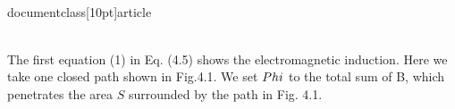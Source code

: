 \\documentclass[10pt]{article}
\begin{document}
\\[
\\left.\\begin{array}{l}
\\text { (1) } \\nabla \\times \\mathbf{E}=-\\frac{\\partial \\mathbf{B}}{\\partial t}, \\quad \\mathbf{B}=\\mu_{0} \\mathbf{H} \\\\
\\text { (2) } \\nabla \\times \\mathbf{H}=\\frac{\\partial \\mathbf{D}}{\\partial t}+\\mathbf{J}, \\mathbf{D}=\\varepsilon_{0} \\mathbf{E}  \\tag{4.5}\\\\
\\text { (3) } \\nabla \\cdot \\mathbf{E}=\\frac{\\rho}{\\varepsilon_{0}} \\\\
\\text { (4) } \\nabla \\cdot \\mathbf{B}=0
\\end{array}\\right\\}
\\]

The first equation (1) in Eq. (4.5) shows the electromagnetic induction. Here we take one closed path shown in Fig.4.1. We set $\\Phi$ to the total sum of B, which penetrates the area $S$ surrounded by the path in Fig. 4.1.
\end{document}
